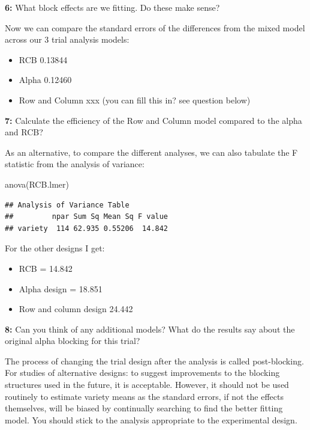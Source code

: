 \documentclass[
]{book}
\makeatletter
\newenvironment{Shaded}{\begin{snugshade}}{\end{snugshade}}
\newcommand{\FunctionTok}[1]{\textcolor[rgb]{0.00,0.00,0.00}{#1}}
\newcommand{\NormalTok}[1]{#1}
\providecommand{\tightlist}{%
  \setlength{\itemsep}{0pt}\setlength{\parskip}{0pt}}
\newenvironment{kframe}{%
\medskip{}
\setlength{\fboxsep}{.8em}
 \def\at@end@of@kframe{}%
 \ifinner\ifhmode%
  \def\at@end@of@kframe{\end{minipage}}%
  \begin{minipage}{\columnwidth}%
 \fi\fi%
 \def\FrameCommand##1{\hskip\@totalleftmargin \hskip-\fboxsep
 \colorbox{shadecolor}{##1}\hskip-\fboxsep
     \hskip-\linewidth \hskip-\@totalleftmargin \hskip\columnwidth}%
 \MakeFramed {\advance\hsize-\width
   \@totalleftmargin\z@ \linewidth\hsize
   \@setminipage}}%
 {\par\unskip\endMakeFramed%
 \at@end@of@kframe}
\newenvironment{rmdblock}[1]
  {
  \begin{itemize}
  \renewcommand{\labelitemi}{
    \raisebox{-.7\height}[0pt][0pt]{
      {\setkeys{Gin}{width=3em,keepaspectratio}\texttt{[image: images/\#1]}}
    }
  }
  \setlength{\fboxsep}{1em}
  \begin{kframe}
  \item
  }
  {
  \end{kframe}
  \end{itemize}
  }
\newenvironment{rmdquiz}
  {\begin{rmdblock}{quiz}}
  {\end{rmdblock}}
\makeatother
\begin{document}
\begin{rmdquiz}
\textbf{6:}
What block effects are we fitting. Do these make sense?
\end{rmdquiz}

Now we can compare the standard errors of the differences from the mixed model across our 3 trial analysis models:

\begin{itemize}
\tightlist
\item
  RCB 0.13844
\item
  Alpha 0.12460
\item
  Row and Column xxx (you can fill this in? see question below)
\end{itemize}

\begin{rmdquiz}
\textbf{7:}
Calculate the efficiency of the Row and Column model compared to the alpha and RCB?
\end{rmdquiz}

As an alternative, to compare the different analyses, we can also tabulate the F statistic from the analysis of variance:

\begin{Shaded}
\begin{Highlighting}[]
\FunctionTok{anova}\NormalTok{(RCB.lmer)}
\end{Highlighting}
\end{Shaded}

\begin{verbatim}
## Analysis of Variance Table
##         npar Sum Sq Mean Sq F value
## variety  114 62.935 0.55206  14.842
\end{verbatim}

For the other designs I get:

\begin{itemize}
\tightlist
\item
  RCB = 14.842
\item
  Alpha design = 18.851
\item
  Row and column design 24.442
\end{itemize}

\begin{rmdquiz}
\textbf{8:}
Can you think of any additional models? What do the results say about the original alpha blocking for this trial?
\end{rmdquiz}

The process of changing the trial design after the analysis is called post-blocking. For studies of alternative designs: to suggest improvements to the blocking structures used in the future, it is acceptable. However, it should not be used routinely to estimate variety means as the standard errors, if not the effects themselves, will be biased by continually searching to find the better fitting model. You should stick to the analysis appropriate to the experimental design.
\end{document}

